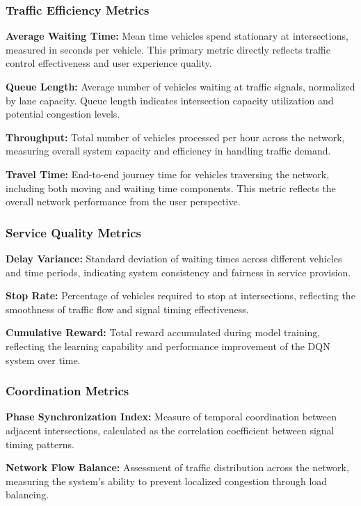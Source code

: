 \subsubsection{Traffic Efficiency Metrics}

\textbf{Average Waiting Time:} Mean time vehicles spend stationary at intersections, measured 
in seconds per vehicle. This primary metric directly reflects traffic control effectiveness and 
user experience quality.

\textbf{Queue Length:} Average number of vehicles waiting at traffic signals, normalized by lane 
capacity. Queue length indicates intersection capacity utilization and potential congestion levels.

\textbf{Throughput:} Total number of vehicles processed per hour across the network, measuring 
overall system capacity and efficiency in handling traffic demand.

\textbf{Travel Time:} End-to-end journey time for vehicles traversing the network, including both 
moving and waiting time components. This metric reflects the overall network performance from the 
user perspective.

\subsubsection{Service Quality Metrics}

\textbf{Delay Variance:} Standard deviation of waiting times across different vehicles and time 
periods, indicating system consistency and fairness in service provision.

\textbf{Stop Rate:} Percentage of vehicles required to stop at intersections, reflecting the 
smoothness of traffic flow and signal timing effectiveness.

\textbf{Cumulative Reward:} Total reward accumulated during model training, reflecting the learning 
capability and performance improvement of the DQN system over time.

\subsubsection{Coordination Metrics}

\textbf{Phase Synchronization Index:} Measure of temporal coordination between adjacent 
intersections, calculated as the correlation coefficient between signal timing patterns.

\textbf{Network Flow Balance:} Assessment of traffic distribution across the network, measuring 
the system's ability to prevent localized congestion through load balancing.

